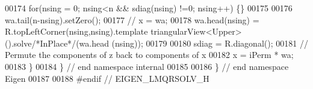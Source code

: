 \begin{DoxyCode}
00174     \textcolor{keywordflow}{for}(nsing = 0; nsing<n && sdiag(nsing) !=0; nsing++) \{\}
00175     
00176     wa.tail(n-nsing).setZero();
00177 \textcolor{comment}{//     x = wa; }
00178     wa.head(nsing) = R.topLeftCorner(nsing,nsing).template triangularView<Upper>().solve\textcolor{comment}{/*InPlace*/}(wa.head
      (nsing));
00179     
00180     sdiag = R.diagonal();
00181     \textcolor{comment}{// Permute the components of z back to components of x}
00182     x = iPerm * wa; 
00183 \}
00184 \} \textcolor{comment}{// end namespace internal}
00185 
00186 \} \textcolor{comment}{// end namespace Eigen}
00187 
00188 \textcolor{preprocessor}{#endif // EIGEN\_LMQRSOLV\_H}
\end{DoxyCode}
